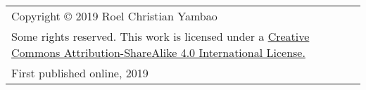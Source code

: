 \thispagestyle{empty}

    \vspace*{\fill}
\begin{flushleft}

\begin{tabularx}{\textwidth}{Y}
Copyright © 2019 Roel Christian Yambao\\
\addlinespace
Some rights reserved. This work is licensed under a
\href{https://creativecommons.org/licenses/by-sa/4.0/}{Creative Commons
Attribution-ShareAlike 4.0 International License.}\\
\addlinespace
First published online, 2019

\end{tabularx}

\end{flushleft}
